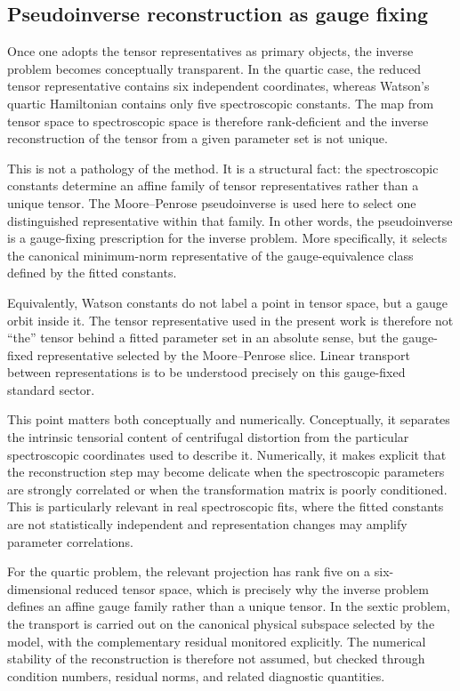\documentclass[journal=jacsat,manuscript=article]{achemso}
\begin{document}
\subsection{Pseudoinverse reconstruction as gauge fixing}

Once one adopts the tensor representatives as primary objects, the
inverse problem becomes conceptually transparent. In the quartic case,
the reduced tensor representative contains six independent
coordinates, whereas Watson's quartic Hamiltonian contains only five
spectroscopic constants. The map from tensor space to spectroscopic
space is therefore rank-deficient and the inverse reconstruction of
the tensor from a given parameter set is not unique.

This is not a pathology of the method. It is a structural fact: the
spectroscopic constants determine an affine family of tensor
representatives rather than a unique tensor. The Moore--Penrose
pseudoinverse is used here to select one distinguished representative
within that family. In other words, the pseudoinverse is a
gauge-fixing prescription for the inverse problem. More specifically,
it selects the canonical minimum-norm representative of the
gauge-equivalence class defined by the fitted constants.

Equivalently, Watson constants do not label a point in tensor space,
but a gauge orbit inside it. The tensor representative used in the
present work is therefore not ``the'' tensor behind a fitted parameter
set in an absolute sense, but the gauge-fixed representative selected
by the Moore--Penrose slice. Linear transport between representations
is to be understood precisely on this gauge-fixed standard sector.

This point matters both conceptually and numerically. Conceptually, it
separates the intrinsic tensorial content of centrifugal distortion
from the particular spectroscopic coordinates used to describe it.
Numerically, it makes explicit that the reconstruction step may become
delicate when the spectroscopic parameters are strongly correlated or
when the transformation matrix is poorly conditioned. This is
particularly relevant in real spectroscopic fits, where the fitted
constants are not statistically independent and representation changes
may amplify parameter correlations.

For the quartic problem, the relevant projection has rank five on a
six-dimensional reduced tensor space, which is precisely why the
inverse problem defines an affine gauge family rather than a unique
tensor. In the sextic problem, the transport is carried out on the
canonical physical subspace selected by the model, with the
complementary residual monitored explicitly. The numerical stability
of the reconstruction is therefore not assumed, but checked through
condition numbers, residual norms, and related diagnostic quantities.
\end{document}
